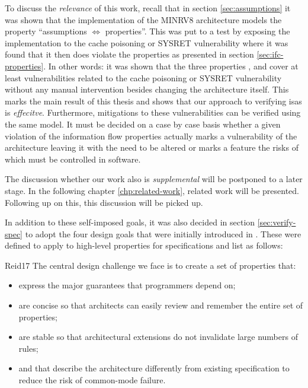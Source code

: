 To discuss the \textit{relevance} of this work, recall that in section \ref{sec:assumptions} it was shown that the implementation of the MINRV8 architecture models the property \enquote{assumptions $ \Leftrightarrow $ properties}.
This was put to a test by exposing the implementation to the cache poisoning or SYSRET vulnerability where it was found that it then does violate the properties as presented in section \ref{sec:ifc-properties}.
In other words: it was shown that the three properties ,  and  cover at least vulnerabilities related to the cache poisoning or SYSRET vulnerability without any manual intervention besides changing the architecture itself.
This marks the main result of this thesis and shows that our approach to verifying \glspl{isa} is \textit{effecitve}.
Furthermore, mitigations to these vulnerabilities can be verified using the same model.
It must be decided on a case by case basis whether a given violation of the information flow properties actually marks a vulnerability of the architecture leaving it with the need to be altered or marks a feature the risks of which must be controlled in software.

The discussion whether our work also is \textit{supplemental} will be postponed to a later stage.
In the following chapter \ref{chp:related-work}, related work will be presented.
Following up on this, this discussion will be picked up.

In addition to these self-imposed goals, it was also decided in section \ref{sec:verify-spec} to adopt the four design goals that were initially introduced in \cite{Reid17}.
These were defined to apply to high-level properties for specifications and list as follows:
\begin{displaycquote}[pp.88:2-3]{Reid17}
    The central design challenge we face is to create a set of properties that:
    \begin{itemize}
        \item express the major guarantees that programmers depend on;
        \item are concise so that architects can easily review and remember the entire set of properties;
        \item are stable so that architectural extensions do not invalidate large numbers of rules;
        \item and that describe the architecture differently from existing specification to reduce the risk of common-mode failure.
    \end{itemize}
\end{displaycquote}


